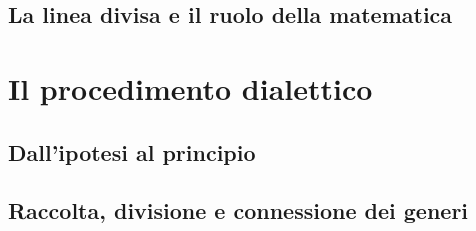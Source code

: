 \subsection{La linea divisa e il ruolo della matematica}

\section{Il procedimento dialettico}

\subsection{Dall'ipotesi al principio}

\subsection{Raccolta, divisione e connessione dei generi}
